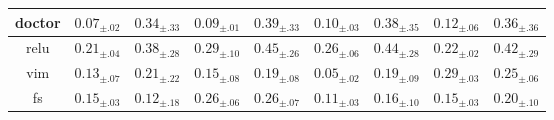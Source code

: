 \begin{table}
{\begin{tabular}{c|c|c|c|c|c|c|c|c|c}
		\multicolumn{2}{c|}{\gls{doctor}} & $\mathbf{0.07}_{\pm .02}$ & $0.34_{\pm .33}$ & $\mathbf{0.09}_{\pm .01}$ & $0.39_{\pm .33}$ & $0.10_{\pm .03}$ & $0.38_{\pm .35}$ & $0.12_{\pm .06}$ & $0.36_{\pm .36}$ \\\hline
		\multicolumn{2}{c|}{\gls{relu}} & $0.21_{\pm .04}$ & $0.38_{\pm .28}$ & $0.29_{\pm .10}$ & $0.45_{\pm .26}$ & $0.26_{\pm .06}$ & $0.44_{\pm .28}$ & $0.22_{\pm .02}$ & $0.42_{\pm .29}$ \\\hline
		\multicolumn{2}{c|}{\gls{vim}} & $0.13_{\pm .07}$ & $0.21_{\pm .22}$ & $0.15_{\pm .08}$ & $0.19_{\pm .08}$ & $\mathbf{0.05}_{\pm .02}$ & $0.19_{\pm .09}$ & $0.29_{\pm .03}$ & $0.25_{\pm .06}$ \\\hline
		\multicolumn{2}{c|}{\gls{fs}} & $0.15_{\pm .03}$ & $0.12_{\pm .18}$ & $0.26_{\pm .06}$ & $0.26_{\pm .07}$ & $0.11_{\pm .03}$ & $0.16_{\pm .10}$ & $0.15_{\pm .03}$ & $0.20_{\pm .10}$ \\\hline
	\end{tabular}%
	}
\end{table}
